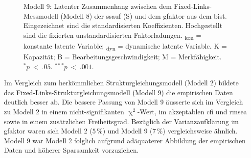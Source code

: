 \documentclass[11pt, twoside, a4paper]{book}		%
\begin{document}
\begin{figure}[htbp]
\begin{adjustbox}{width=1\textwidth}
	\end{adjustbox}
	
	\vspace{.2cm}
	\caption[Modell 9: Fixed-Links-Strukturgleichungsmodell zur Vorhersage des \gls{gfaktor}s durch die \gls{ssauf}]{Modell 9: Latenter Zusammenhang zwischen dem Fixed-Links-Messmodell (Modell 8) der \gls{ssauf} (\textsf{S}) und dem \gls{gfaktor} aus dem \gls{bist}. Eingezeichnet sind die standardisierten Koeffizienten. Hochgestellt sind die fixierten unstandardisierten Faktorladungen. \textsf{\textsubscript{kon}} = konstante latente Variable; \textsf{\textsubscript{dyn}} = dynamische latente Variable. \textsf{K} = Kapazität; \textsf{B} = Bearbeitungsgeschwindigkeit; \textsf{M} = Merkfähigkeit.\\
	$^{*}p~<~.05$. $^{***}p~<~.001$.
	}
	\label{fig:spatial_suppression_fixedlinks_sem}
\end{figure} 

Im Vergleich zum herkömmlichen Strukturgleichungsmodell (Modell 2) bildete das Fixed-Links-Strukturgleichungsmodell (Modell 9) die empirischen Daten deutlich besser ab. Die bessere Passung von Modell 9 äusserte sich im Vergleich zu Modell 2 in einem nicht-signifikanten $\upchi^2$-Wert, im akzeptablen \gls{cfi} und \gls{rmsea} sowie in einem zusätzlichen Freiheitsgrad. Bezüglich der Varianzaufklärung im \gls{gfaktor} waren sich Modell 2 ($5\,\%$) und Modell 9 ($7\,\%$)  vergleichsweise ähnlich. Modell 9 war Modell 2 folglich aufgrund adäquaterer Abbildung der empirischen Daten und höherer Sparsamkeit vorzuziehen. 
\end{document}
